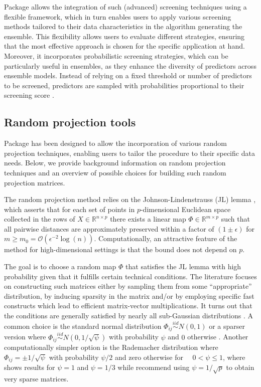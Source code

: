 \documentclass[
  article]{jss}
\begin{document}
Package  allows the integration of such (advanced) screening
techniques using a flexible framework, which in turn enables users to
apply various screening methods tailored to their data characteristics
in the algorithm generating the ensemble. This flexibility allows users
to evaluate different strategies, ensuring that the most effective
approach is chosen for the specific application at hand. Moreover, it
incorporates probabilistic screening strategies, which can be
particularly useful in ensembles, as they enhance the diversity of
predictors across ensemble models. Instead of relying on a fixed
threshold or number of predictors to be screened, predictors are sampled
with probabilities proportional to their screening score
\citep[see][]{Dunson2020TargRandProj, parzer2024glms}.

\subsection{Random projection tools}\label{sec-rps}

Package  has been designed to allow the incorporation of
various random projection techniques, enabling users to tailor the
procedure to their specific data needs. Below, we provide background
information on random projection techniques and an overview of possible
choices for building such random projection matrices.

The random projection method relies on the Johnson-Lindenstrauss (JL)
lemma \citep{JohnsonLindenstrauss1984}, which asserts that for each set
of points in \(p\)-dimensional Euclidean space collected in the rows of
\(X\in \mathbb{R}^{n\times p}\) there exists a linear map
\(\Phi\in \mathbb{R}^{m \times p}\) such that all pairwise distances are
approximately preserved within a factor of \((1\pm\epsilon)\) for
\(m\geq m_0=\mathcal O(\epsilon^{-2}\log(n))\). Computationally, an
attractive feature of the method for high-dimensional settings is that
the bound does not depend on \(p\).

The goal is to choose a random map \(\Phi\) that satisfies the JL lemma
with high probability given that it fulfills certain technical
conditions. The literature focuses on constructing such matrices either
by sampling them from some ``appropriate'' distribution, by inducing
sparsity in the matrix and/or by employing specific fast constructs
which lead to efficient matrix-vector multiplications. It turns out that
the conditions are generally satisfied by nearly all sub-Gaussian
distributions \citep{matouvsek2008variants}. A common choice is the
standard normal distribution \(\Phi_{ij} \overset{iid}{\sim} N(0,1)\)
\citep{FRANKL1988JLSphere} or a sparser version where
\(\Phi_{ij}\overset{iid}{\sim} N(0,1/\sqrt{\psi})\) with probability
\(\psi\) and \(0\) otherwise \citep{matouvsek2008variants}. Another
computationally simpler option is the Rademacher distribution where
\(\Phi_{ij} =  \pm 1/\sqrt{\psi}\) with probability \(\psi/2\) and zero
otherwise for \(\quad 0<\psi\leq 1\), where \citet{ACHLIOPTAS2003JL}
shows results for \(\psi=1\) and \(\psi=1/3\) while
\citet{LiHastie2006VerySparseRP} recommend using \(\psi=1/\sqrt{p}\) to
obtain very sparse matrices.
\end{document}
